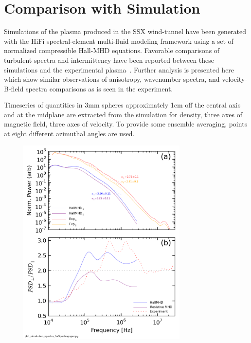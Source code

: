 \documentclass[aip,prl,amsmath,amssymb,reprint,superscriptaddress]{revtex4-1} %
\begin{document}
\section{Comparison with Simulation}

Simulations of the plasma produced in the SSX wind-tunnel have been generated with the HiFi spectral-element multi-fluid modeling framework using a set of normalized compressible Hall-MHD equations. Favorable comparisons of turbulent spectra and intermittency have been reported between these simulations and the experimental plasma~\cite{schaffner14a}. Further analysis is presented here which show similar observations of anisotropy, wavenumber spectra, and velocity-B-field spectra comparisons as is seen in the experiment.

Timeseries of quantities in 3mm spheres approximately 1cm off the central axis and at the midplane are extracted from the simulation for density, three axes of magnetic field, three axes of velocity. To provide some ensemble averaging, points at eight different azimuthal angles are used.

\begin{figure}[!htbp]
\centerline{
\includegraphics[width=8.5cm]{Anisotropy_simulation_comparison}}
\caption{\label{fig:aniso_comp}}
\end{figure}
\end{document}
